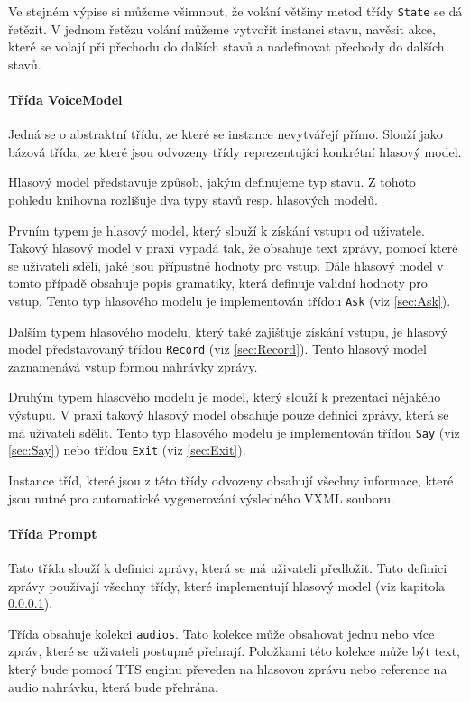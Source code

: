 \documentclass[ing,male,java,dept460]{diploma}						%
\begin{document}
Ve stejném výpise si můžeme všimnout, že volání většiny metod třídy \texttt{State} se dá řetězit. V jednom řetězu volání můžeme vytvořit instanci stavu, navěsit akce, které se volají při přechodu do dalších stavů a nadefinovat přechody do dalších stavů.

\paragraph{Třída VoiceModel}
\label{sec:VoiceModel}
Jedná se o abstraktní třídu, ze které se instance nevytvářejí přímo. Slouží jako bázová třída, ze které jsou odvozeny třídy reprezentující konkrétní hlasový model.

Hlasový model představuje způsob, jakým definujeme typ stavu. Z tohoto pohledu knihovna rozlišuje dva typy stavů resp. hlasových modelů.

Prvním typem je hlasový model, který slouží k získání vstupu od uživatele. Takový hlasový model v praxi vypadá tak, že obsahuje text zprávy, pomocí které se uživateli sdělí, jaké jsou přípustné hodnoty pro vstup. Dále hlasový model v tomto případě obsahuje popis gramatiky, která definuje validní hodnoty pro vstup. Tento typ hlasového modelu je implementován třídou \texttt{Ask} (viz \ref{sec:Ask}).

Dalším typem hlasového modelu, který také zajišťuje získání vstupu, je hlasový model představovaný třídou \texttt{Record} (viz \ref{sec:Record}). Tento hlasový model zaznamenává vstup formou nahrávky zprávy.

Druhým typem hlasového modelu je model, který slouží k prezentaci nějakého výstupu. V praxi takový hlasový model obsahuje pouze definici zprávy, která se má uživateli sdělit. Tento typ hlasového modelu je implementován třídou \texttt{Say} (viz \ref{sec:Say}) nebo třídou \texttt{Exit} (viz \ref{sec:Exit}).

Instance tříd, které jsou z této třídy odvozeny obsahují všechny informace, které jsou nutné pro automatické vygenerování výsledného VXML souboru.

\paragraph{Třída Prompt}
\label{sec:Prompt}
Tato třída slouží k definici zprávy, která se má uživateli předložit. Tuto definici zprávy používají všechny třídy, které implementují hlasový model (viz kapitola \ref{sec:VoiceModel}).

Třída obsahuje kolekci \texttt{audios}. Tato kolekce může obsahovat jednu nebo více zpráv, které se uživateli postupně přehrají. Položkami této kolekce může být text, který bude pomocí TTS enginu převeden na hlasovou zprávu nebo reference na audio nahrávku, která bude přehrána.
\end{document}
